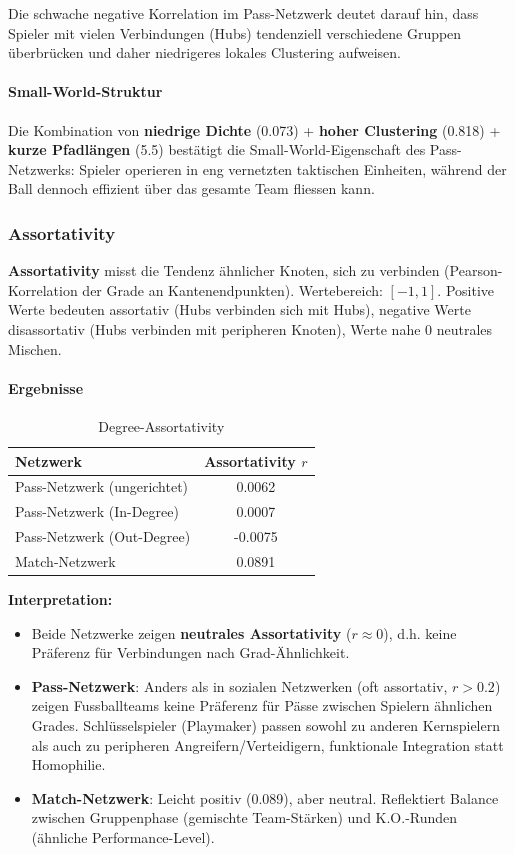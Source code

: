 Die schwache negative Korrelation im Pass-Netzwerk deutet darauf hin, dass Spieler mit vielen Verbindungen (Hubs) tendenziell verschiedene Gruppen überbrücken und daher niedrigeres lokales Clustering aufweisen.

\paragraph{Small-World-Struktur}
Die Kombination von \textbf{niedrige Dichte} (0.073) + \textbf{hoher Clustering} (0.818) + \textbf{kurze Pfadlängen} (5.5) bestätigt die Small-World-Eigenschaft des Pass-Netzwerks: Spieler operieren in eng vernetzten taktischen Einheiten, während der Ball dennoch effizient über das gesamte Team fliessen kann.

\subsubsection{Assortativity}

\textbf{Assortativity} misst die Tendenz ähnlicher Knoten, sich zu verbinden (Pearson-Korrelation der Grade an Kantenendpunkten). Wertebereich: $[-1, 1]$. Positive Werte bedeuten assortativ (Hubs verbinden sich mit Hubs), negative Werte disassortativ (Hubs verbinden mit peripheren Knoten), Werte nahe 0 neutrales Mischen.

\paragraph{Ergebnisse}

\begin{table}[h]
\centering
\caption{Degree-Assortativity}
\label{tab:assortativity}
\begin{tabular}{lc}
\toprule
\textbf{Netzwerk} & \textbf{Assortativity $r$} \\
\midrule
Pass-Netzwerk (ungerichtet) & 0.0062 \\
Pass-Netzwerk (In-Degree) & 0.0007 \\
Pass-Netzwerk (Out-Degree) & -0.0075 \\
Match-Netzwerk & 0.0891 \\
\bottomrule
\end{tabular}
\end{table}

\textbf{Interpretation:}
\begin{itemize}
  \item Beide Netzwerke zeigen \textbf{neutrales Assortativity} ($r \approx 0$), d.h. keine Präferenz für Verbindungen nach Grad-Ähnlichkeit.
  \item \textbf{Pass-Netzwerk}: Anders als in sozialen Netzwerken (oft assortativ, $r > 0.2$) zeigen Fussballteams keine Präferenz für Pässe zwischen Spielern ähnlichen Grades. Schlüsselspieler (Playmaker) passen sowohl zu anderen Kernspielern als auch zu peripheren Angreifern/Verteidigern, funktionale Integration statt Homophilie.
  \item \textbf{Match-Netzwerk}: Leicht positiv (0.089), aber neutral. Reflektiert Balance zwischen Gru\-ppenphase (gemischte Team-Stärken) und K.O.-Runden (ähnliche Performance-Level).
\end{itemize}

